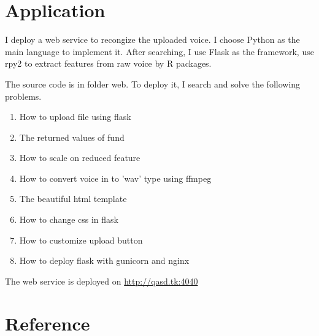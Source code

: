 


\maketitle

\tableofcontents

\newpage











\section{Application}
I deploy a web service to recongize the uploaded voice. I choose Python as the main language to implement it. After searching, I use Flask\cite{flask} as the framework, use rpy2\cite{rpy2} to extract features from raw voice by R packages.

The source code is in folder web. To deploy it, I search and solve the following problems.
\begin{enumerate}
    \item How to upload file using flask \cite{upload_file}
    \item The returned values of fund \cite{r_fund}
    \item How to scale on reduced feature \cite{scale_feature}
    \item How to convert voice in to 'wav' type using ffmpeg \cite{ffmpeg_convert}
    \item The beautiful html template \cite{html_template}
    \item How to change css in flask \cite{css_flask}
    \item How to customize upload button \cite{upload_button}
    \item How to deploy flask with gunicorn and nginx \cite{flask_deploy}
\end{enumerate}

The web service is deployed on \url{http://qasd.tk:4040}

\section{Reference}


